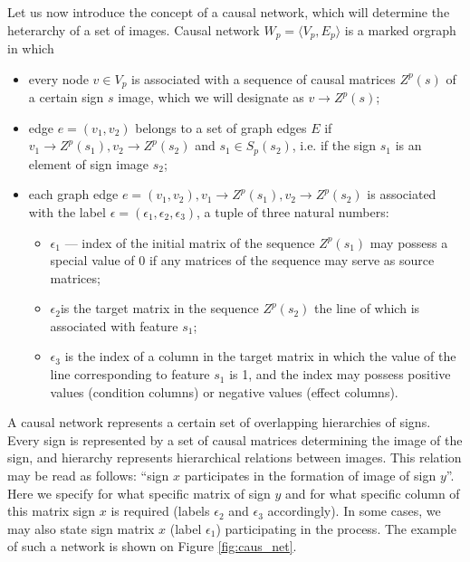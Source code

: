 \documentclass[review]{elsarticle}
\begin{document}
Let us now introduce the concept of a causal network, which will determine the heterarchy of a set of images. Causal network $W_p=\langle V_p, E_p \rangle$ is a marked orgraph in which
\begin{itemize}
	\item every node $v\in V_p$ is associated with a sequence of causal matrices $Z^p(s)$ of a certain sign $s$ image, which we will designate as $v\rightarrow Z^p(s)$;
	\item edge $e=(v_1, v_2)$ belongs to a set of graph edges $E$ if $v_1\rightarrow Z^p(s_1), v_2\rightarrow Z^p(s_2)$ and $s_1\in S_p(s_2)$, i.e. if the sign $s_1$ is an element of sign image $s_2$;
	\item each graph edge $e=(v_1, v_2), v_1\rightarrow Z^p(s_1), v_2\rightarrow Z^p(s_2)$ is associated with the label $\epsilon=(\epsilon_1,\epsilon_2,\epsilon_3)$, a tuple of three natural numbers:
	\begin{itemize}
		\item $\epsilon_1$ --- index of the initial matrix of the sequence $Z^p(s_1)$ may possess a special value of 0 if any matrices of the sequence may serve as source matrices;
		\item $\epsilon_2$is the target matrix in the sequence $Z^p(s_2)$ the line of which is associated with feature $s_1$;
		\item $\epsilon_3$ is the index of a column in the target matrix in which the value of the line corresponding to feature $s_1$ is 1, and the index may possess positive values (condition columns) or negative values (effect columns).
	\end{itemize}		
\end{itemize}

A causal network represents a certain set of overlapping hierarchies of signs. Every sign is represented by a set of causal matrices determining the image of the sign, and hierarchy represents hierarchical relations between images. This relation may be read as follows: ``sign $x$ participates in the formation of image of sign $y$''. Here we specify for what specific matrix of sign $y$ and for what specific column of this matrix sign $x$ is required (labels $\epsilon_2$ and $\epsilon_3$ accordingly). In some cases, we may also state sign matrix $x$ (label $\epsilon_1$) participating in the process. The example of such a network is shown on Figure \ref{fig:caus_net}.
\end{document}
